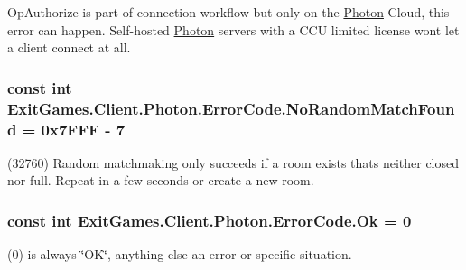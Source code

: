 Op\+Authorize is part of connection workflow but only on the \hyperlink{namespace_exit_games_1_1_client_1_1_photon}{Photon} Cloud, this error can happen. Self-\/hosted \hyperlink{namespace_exit_games_1_1_client_1_1_photon}{Photon} servers with a C\+CU limited license won\textquotesingle{}t let a client connect at all. 
\subsubsection[{\texorpdfstring{No\+Random\+Match\+Found}{NoRandomMatchFound}}]{\setlength{\rightskip}{0pt plus 5cm}const int Exit\+Games.\+Client.\+Photon.\+Error\+Code.\+No\+Random\+Match\+Found = 0x7\+F\+F\+F -\/ 7}\hypertarget{class_exit_games_1_1_client_1_1_photon_1_1_error_code_ab72bc9e6c9cb2af830c33d613ddc2b6f}{}\label{class_exit_games_1_1_client_1_1_photon_1_1_error_code_ab72bc9e6c9cb2af830c33d613ddc2b6f}


(32760) Random matchmaking only succeeds if a room exists thats neither closed nor full. Repeat in a few seconds or create a new room.

\subsubsection[{\texorpdfstring{Ok}{Ok}}]{\setlength{\rightskip}{0pt plus 5cm}const int Exit\+Games.\+Client.\+Photon.\+Error\+Code.\+Ok = 0}\hypertarget{class_exit_games_1_1_client_1_1_photon_1_1_error_code_a22e4adab4389f1eea01c8bbcf3b6fbd8}{}\label{class_exit_games_1_1_client_1_1_photon_1_1_error_code_a22e4adab4389f1eea01c8bbcf3b6fbd8}


(0) is always \char`\"{}\+O\+K\char`\"{}, anything else an error or specific situation.

